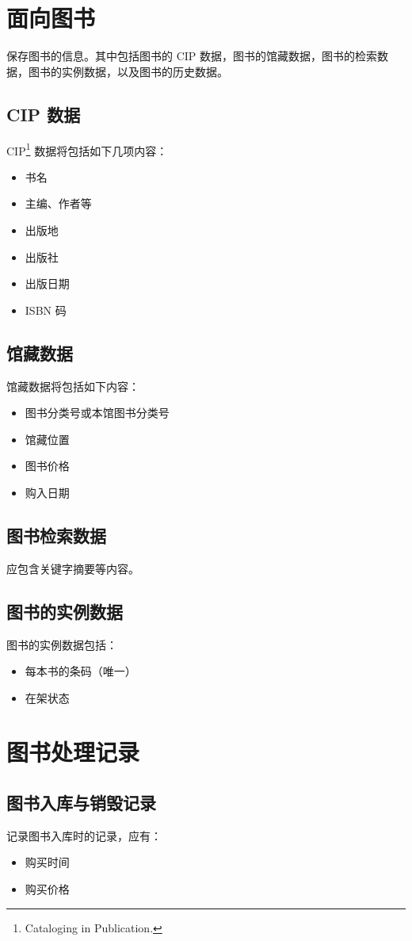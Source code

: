 \documentclass[UTF8]{ctexrep}
\begin{document}
    \section{面向图书}
    保存图书的信息。其中包括图书的 CIP 数据，图书的馆藏数据，图书的检索数据，图书的实例数据，以及图书的历史数据。
    \subsection{CIP 数据}
    CIP\footnote{Cataloging in Publication.}  数据将包括如下几项内容：
    \begin{itemize}
    	\item 书名
    	\item 主编、作者等
    	\item 出版地
    	\item 出版社
    	\item 出版日期
    	\item ISBN 码
    \end{itemize}
    \subsection{馆藏数据}
    馆藏数据将包括如下内容：
    \begin{itemize}
    	\item 图书分类号或本馆图书分类号
    	\item 馆藏位置
    	\item 图书价格
    	\item 购入日期
    \end{itemize}
    \subsection{图书检索数据}
    应包含关键字摘要等内容。
    \subsection{图书的实例数据}
    图书的实例数据包括：
    \begin{itemize}
    	\item 每本书的条码（唯一）
    	\item 在架状态
    \end{itemize}
    \section{图书处理记录}
    \subsection{图书入库与销毁记录}
    记录图书入库时的记录，应有：
    \begin{itemize}
        \item 购买时间
        \item 购买价格
    \end{itemize}
    
\end{document}
